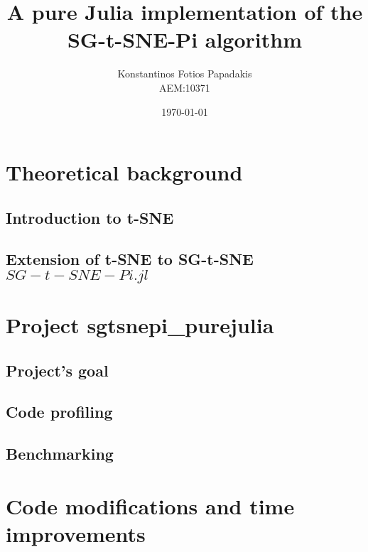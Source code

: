 \documentclass[twocolumn]{report}
\begin{document}
\title{\Huge \bfseries A pure Julia implementation of the SG-t-SNE-Pi algorithm} %
\author{Konstantinos Fotios Papadakis\vspace{0.5cm} \\  AEM:10371} %
\date{\today}
\maketitle

\tableofcontents

\chapter{Theoretical background}
\section{Introduction to t-SNE}

\section{Extension of t-SNE to SG-t-SNE \(SG-t-SNE-Pi.jl\)}


\chapter{Project sgtsnepi\_purejulia}
\section{Project's goal}

\section{Code profiling}

\section{Benchmarking}


\chapter{Code modifications and time improvements}
\end{document}
